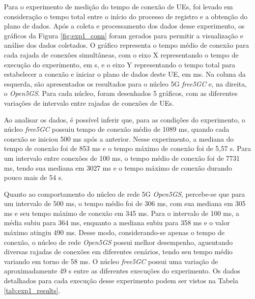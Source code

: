 Para o experimento de medição do tempo de conexão de UEs, foi levado em consideração o tempo total entre o início do processo de registro e a obtenção do plano de dados. Após a coleta e processamento dos dados desse experimento, os gráficos da Figura \ref{fig:exp1_conn} foram gerados para permitir a visualização e análise dos dados coletados.
O gráfico representa o tempo médio de conexão para cada rajada de conexões simultâneas, com o eixo X representando o tempo de execução do experimento, em s, e o eixo Y representando o tempo total para estabelecer a conexão e iniciar o plano de dados deste UE, em ms.
Na coluna da esquerda, são apresentados os resultados para o núcleo 5G \textit{free5GC} e, na direita, o \textit{Open5GS}. Para cada núcleo, foram desenhados 5 gráficos, com as diferentes variações de intervalo entre rajadas de conexões de UEs.

Ao analisar os dados, é possível inferir que, para as condições do experimento, o núcleo \textit{free5GC} possuiu tempo de conexão médio de 1089 ms, quando cada conexão se iniciou 500 ms após a anterior.
Nesse experimento, a mediana do tempo de conexão foi de 853 ms e o tempo máximo de conexão foi de 5,57 s.
Para um intervalo entre conexões de 100 ms, o tempo médio de conexão foi de 7731 ms, tendo sua mediana em 3027 ms e o tempo máximo de conexão durando pouco mais de 54 s.

Quanto ao comportamento do núcleo de rede 5G \textit{Open5GS}, percebe-se que para um intervalo de 500 ms, o tempo médio foi de 306 ms, com sua mediana em 305 ms e seu tempo máximo de conexão em 345 ms.
Para o intervalo de 100 ms, a média subiu para 364 ms, enquanto a mediana subiu para 358 ms e o valor máximo atingiu 490 ms.
Desse modo, considerando-se apenas o tempo de conexão, o núcleo de rede \textit{Open5GS} possui melhor desempenho, aguentando diversas rajadas de conexões em diferentes cenários, tendo seu tempo médio variando em torno de 58 ms. O núcleo \textit{free5GC} possui uma variação de aproximadamente 49 s entre as diferentes execuções do experimento.
Os dados detalhados para cada execução desse experimento podem ser vistos na Tabela \ref{tab:exp1_results}.

